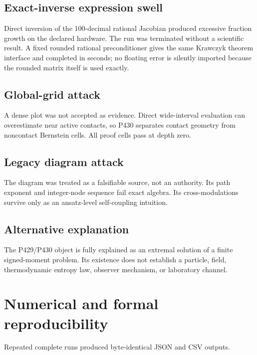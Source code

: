 \documentclass[11pt,a4paper]{article}
\begin{document}
\subsection{Exact-inverse expression swell}
Direct inversion of the 100-decimal rational Jacobian produced excessive
fraction growth on the declared hardware. The run was terminated without a
scientific result. A fixed rounded rational preconditioner gives the same
Krawczyk theorem interface and completed in seconds; no floating error is
silently imported because the rounded matrix itself is used exactly.

\subsection{Global-grid attack}
A dense plot was not accepted as evidence. Direct wide-interval evaluation can
overestimate near active contacts, so P430 separates contact geometry from
noncontact Bernstein cells. All proof cells pass at depth zero.

\subsection{Legacy diagram attack}
The diagram was treated as a falsifiable source, not an authority. Its path
exponent and integer-node sequence fail exact algebra. Its cross-modulations
survive only as an ansatz-level self-coupling intuition.

\subsection{Alternative explanation}
The P429/P430 object is fully explained as an extremal solution of a finite
signed-moment problem. Its existence does not establish a particle, field,
thermodynamic entropy law, observer mechanism, or laboratory channel.

\section{Numerical and formal reproducibility}

Repeated complete runs produced byte-identical JSON and CSV outputs.
\end{document}
